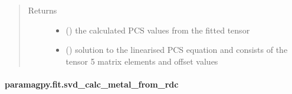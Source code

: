 \documentclass[a4paper,10pt,english,openany,oneside]{sphinxmanual}
\begin{document}
\begin{fulllineitems}
\begin{quote}
\begin{description}
\item[{Returns}] \leavevmode
\begin{itemize}
\item {} 
 () \textendash{} the calculated PCS values from the fitted tensor

\item {} 
 () \textendash{} solution to the linearised PCS equation and
consists of the tensor 5 matrix elements and offset values

\end{itemize}


\end{description}\end{quote}

\end{fulllineitems}



\paragraph{paramagpy.fit.svd\_calc\_metal\_from\_rdc}
\label{\detokenize{reference/generated/paramagpy.fit.svd_calc_metal_from_rdc:paramagpy-fit-svd-calc-metal-from-rdc}}\label{\detokenize{reference/generated/paramagpy.fit.svd_calc_metal_from_rdc::doc}}
\end{document}
